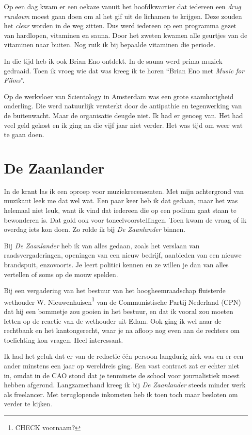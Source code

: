 \documentclass[12pt,twoside, openright]{memoir}
\begin{document}
Op een dag kwam er een oekaze vanuit het hoofdkwartier dat iedereen een \emph{drug rundown} moest gaan doen om al het gif uit de lichamen te krijgen. Deze zouden het \emph{clear} worden in de weg zitten. Dus werd iedereen op een programma gezet van hardlopen, vitaminen en sauna. Door het zweten kwamen alle geurtjes van de vitaminen naar buiten. Nog ruik ik bij bepaalde vitaminen die periode. 

In die tijd heb ik ook Brian Eno ontdekt. In de sauna werd prima muziek gedraaid. Toen ik vroeg wie dat was kreeg ik te horen ``Brian Eno met \emph{Music for Films}''.

Op de werkvloer van Scientology in Amsterdam was een grote saamhorigheid onderling. Die werd natuurlijk versterkt door de antipathie en tegenwerking van de buitenwacht. Maar de organisatie deugde niet. Ik had er genoeg van. Het had veel geld gekost en ik ging na die vijf jaar niet verder. Het was tijd om weer wat te gaan doen.

\chapter{De Zaanlander} %
\label{cha:zaanlander}

In de krant las ik een oproep voor muziekrecensenten. Met mijn achtergrond van muzikant leek me dat wel wat. Een paar keer heb ik dat gedaan, maar het was helemaal niet leuk, want ik vind dat iedereen die op een podium gaat staan te bewonderen is. Dat gold ook voor toneelvoorstellingen. Toen kwam de vraag of ik overdag iets kon doen. Zo rolde ik bij \emph{De Zaanlander} binnen. 

Bij \emph{De Zaanlander} heb ik van alles gedaan, zoals het verslaan van raadsvergaderingen, openingen van een nieuw bedrijf, aanbieden van een nieuwe brandspuit, enzovoorts. Je leert politici kennen en ze willen je dan van alles vertellen of soms op de mouw spelden. 

Bij een vergadering van het bestuur van het hoogheemraadschap fluisterde wethouder W. Nieuwenhuisen\footnote{CHECK voornaam?} van de Communistische Partij Nederland (CPN) dat hij een bommetje zou gooien in het bestuur, en dat ik vooral zou moeten letten op de reactie van de wethouder uit Edam. Ook ging ik wel naar de rechtbank en het kantongerecht, waar je na afloop nog even aan de rechters om toelichting kon vragen. Heel interessant. 

Ik had het geluk dat er van de redactie één persoon langdurig ziek was en er een ander minstens een jaar op wereldreis ging. Een vast contract zat er echter niet in, omdat in de CAO stond dat je tenminste de school voor journalistiek moest hebben afgerond. Langzamerhand kreeg ik bij \emph{De Zaanlander} steeds minder werk als freelancer. Met teruglopende inkomsten heb ik toen toch maar besloten om verder te kijken.
\end{document}
